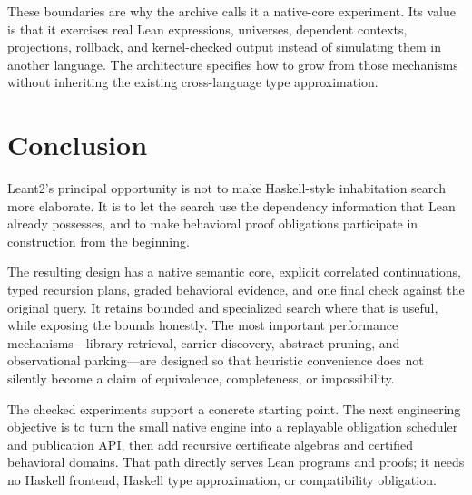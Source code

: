 These boundaries are why the archive calls it a native-core experiment. Its value is that it exercises real Lean expressions, universes, dependent contexts, projections, rollback, and kernel-checked output instead of simulating them in another language. The architecture specifies how to grow from those mechanisms without inheriting the existing cross-language type approximation.

\section{Conclusion}
Leant2's principal opportunity is not to make Haskell-style inhabitation search more elaborate. It is to let the search use the dependency information that Lean already possesses, and to make behavioral proof obligations participate in construction from the beginning.

The resulting design has a native semantic core, explicit correlated continuations, typed recursion plans, graded behavioral evidence, and one final check against the original query. It retains bounded and specialized search where that is useful, while exposing the bounds honestly. The most important performance mechanisms---library retrieval, carrier discovery, abstract pruning, and observational parking---are designed so that heuristic convenience does not silently become a claim of equivalence, completeness, or impossibility.

The checked experiments support a concrete starting point. The next engineering objective is to turn the small native engine into a replayable obligation scheduler and publication API, then add recursive certificate algebras and certified behavioral domains. That path directly serves Lean programs and proofs; it needs no Haskell frontend, Haskell type approximation, or compatibility obligation.
